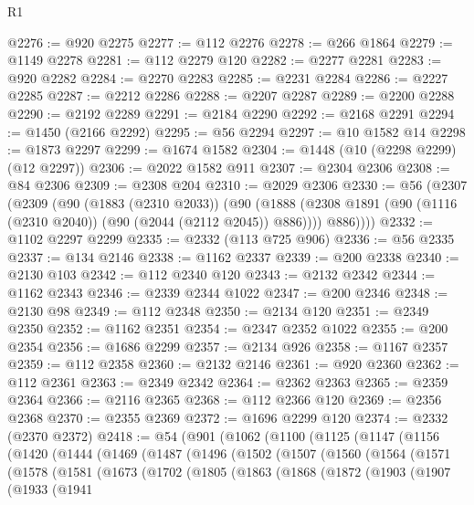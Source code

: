 \begin{lexlean}{R1}
\begin{coremodule}
@2276 := @920 @2275
@2277 := @112 @2276
@2278 := @266 @1864
@2279 := @1149 @2278
@2281 := @112 @2279 @120
@2282 := @2277 @2281
@2283 := @920 @2282
@2284 := @2270 @2283
@2285 := @2231 @2284
@2286 := @2227 @2285
@2287 := @2212 @2286
@2288 := @2207 @2287
@2289 := @2200 @2288
@2290 := @2192 @2289
@2291 := @2184 @2290
@2292 := @2168 @2291
@2294 := @1450 (@2166 @2292)
@2295 := @56 @2294
@2297 := @10 @1582 @14
@2298 := @1873 @2297
@2299 := @1674 @1582
@2304 := @1448 (@10 (@2298 @2299) (@12 @2297))
@2306 := @2022 @1582 @911
@2307 := @2304 @2306
@2308 := @84 @2306
@2309 := @2308 @204
@2310 := @2029 @2306
@2330 := @56
    (@2307
      (@2309
        (@90
          (@1883 (@2310 @2033))
          (@90
            (@1888 (@2308 @1891 (@90 (@1116 (@2310 @2040)) (@90 (@2044 (@2112 @2045)) @886))))
            @886))))
@2332 := @1102 @2297 @2299
@2335 := @2332 (@113 @725 @906)
@2336 := @56 @2335
@2337 := @134 @2146
@2338 := @1162 @2337
@2339 := @200 @2338
@2340 := @2130 @103
@2342 := @112 @2340 @120
@2343 := @2132 @2342
@2344 := @1162 @2343
@2346 := @2339 @2344 @1022
@2347 := @200 @2346
@2348 := @2130 @98
@2349 := @112 @2348
@2350 := @2134 @120
@2351 := @2349 @2350
@2352 := @1162 @2351
@2354 := @2347 @2352 @1022
@2355 := @200 @2354
@2356 := @1686 @2299
@2357 := @2134 @926
@2358 := @1167 @2357
@2359 := @112 @2358
@2360 := @2132 @2146
@2361 := @920 @2360
@2362 := @112 @2361
@2363 := @2349 @2342
@2364 := @2362 @2363
@2365 := @2359 @2364
@2366 := @2116 @2365
@2368 := @112 @2366 @120
@2369 := @2356 @2368
@2370 := @2355 @2369
@2372 := @1696 @2299 @120
@2374 := @2332 (@2370 @2372)
@2418 := @54
    (@901
      (@1062
        (@1100
          (@1125
            (@1147
              (@1156
                (@1420
                  (@1444
                    (@1469
                      (@1487
                        (@1496
                          (@1502
                            (@1507
                              (@1560
                                (@1564
                                  (@1571
                                    (@1578
                                      (@1581
                                        (@1673
                                          (@1702
                                            (@1805
                                              (@1863
                                                (@1868
                                                  (@1872
                                                    (@1903
                                                      (@1907
                                                        (@1933
                                                          (@1941

\end{coremodule}
\end{lexlean}
